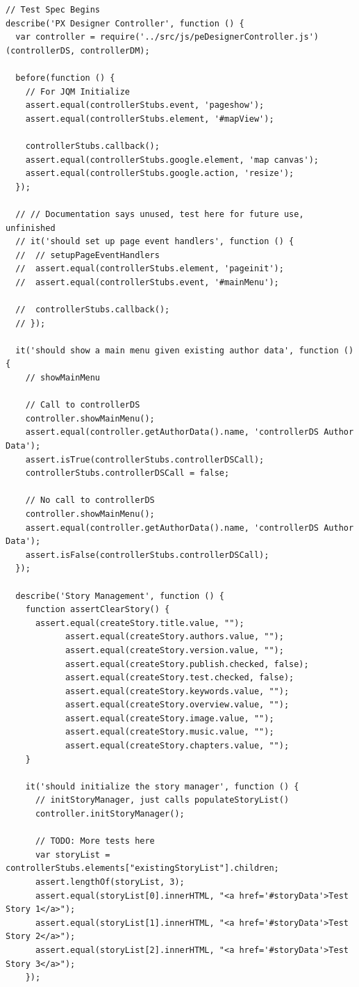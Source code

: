 \documentclass[12pt]{ucthesis}
\begin{document}
\begin{lstlisting}
// Test Spec Begins
describe('PX Designer Controller', function () {
  var controller = require('../src/js/peDesignerController.js')(controllerDS, controllerDM);

  before(function () {
    // For JQM Initialize
    assert.equal(controllerStubs.event, 'pageshow');
    assert.equal(controllerStubs.element, '#mapView');

    controllerStubs.callback();
    assert.equal(controllerStubs.google.element, 'map canvas');
    assert.equal(controllerStubs.google.action, 'resize');
  });

  // // Documentation says unused, test here for future use, unfinished
  // it('should set up page event handlers', function () {
  //  // setupPageEventHandlers
  //  assert.equal(controllerStubs.element, 'pageinit');
  //  assert.equal(controllerStubs.event, '#mainMenu');

  //  controllerStubs.callback();
  // });

  it('should show a main menu given existing author data', function () {
    // showMainMenu

    // Call to controllerDS
    controller.showMainMenu();
    assert.equal(controller.getAuthorData().name, 'controllerDS Author Data');
    assert.isTrue(controllerStubs.controllerDSCall);
    controllerStubs.controllerDSCall = false;

    // No call to controllerDS
    controller.showMainMenu();
    assert.equal(controller.getAuthorData().name, 'controllerDS Author Data');
    assert.isFalse(controllerStubs.controllerDSCall);
  });

  describe('Story Management', function () {
    function assertClearStory() {
      assert.equal(createStory.title.value, "");
            assert.equal(createStory.authors.value, "");
            assert.equal(createStory.version.value, "");
            assert.equal(createStory.publish.checked, false);
            assert.equal(createStory.test.checked, false);
            assert.equal(createStory.keywords.value, "");
            assert.equal(createStory.overview.value, "");
            assert.equal(createStory.image.value, "");
            assert.equal(createStory.music.value, "");
            assert.equal(createStory.chapters.value, "");
    }

    it('should initialize the story manager', function () {
      // initStoryManager, just calls populateStoryList()
      controller.initStoryManager();
      
      // TODO: More tests here
      var storyList = controllerStubs.elements["existingStoryList"].children;
      assert.lengthOf(storyList, 3);
      assert.equal(storyList[0].innerHTML, "<a href='#storyData'>Test Story 1</a>");
      assert.equal(storyList[1].innerHTML, "<a href='#storyData'>Test Story 2</a>");
      assert.equal(storyList[2].innerHTML, "<a href='#storyData'>Test Story 3</a>");
    });
    

\end{lstlisting}
\end{document}

